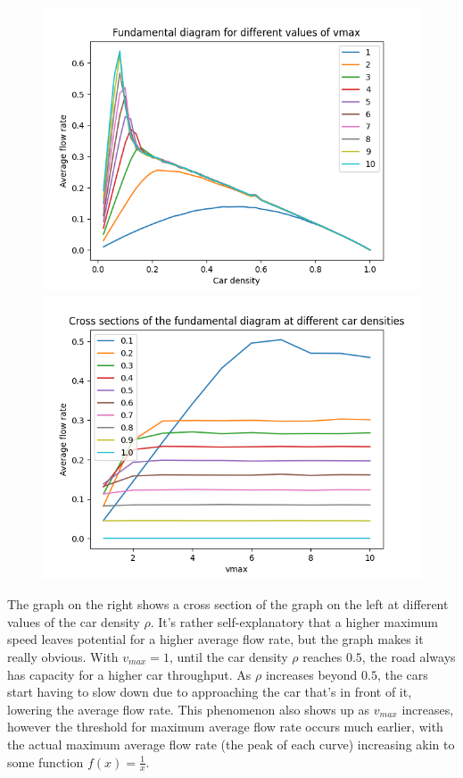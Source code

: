 \documentclass[a4paper,12pt]{article}
\begin{document}
\begin{figure}[!ht]
  \centering
  \begin{minipage}{0.48\textwidth}
    \includegraphics[width=\textwidth]{img/2_2d_fundamental.png}
  \end{minipage}
  \begin{minipage}{0.48\textwidth}
    \includegraphics[width=\textwidth]{img/2_2d_flowrate_vmax_2.png}
  \end{minipage}
\end{figure}

The graph on the right shows a cross section of the graph on the left at different values of the car density $\rho$.
It's rather self-explanatory that a higher maximum speed leaves potential for a higher average flow rate, but the
graph makes it really obvious. With $v_{max} = 1$, until the car density $\rho$ reaches $0.5$, the road always has
capacity for a higher car throughput. As $\rho$ increases beyond $0.5$, the cars start having to slow down due to
approaching the car that's in front of it, lowering the average flow rate. This phenomenon also shows up as $v_{max}$
increases, however the threshold for maximum average flow rate occurs much earlier, with the actual maximum average
flow rate (the peak of each curve) increasing akin to some function $f(x) = \frac{1}{x}$.
\end{document}
